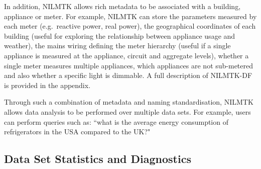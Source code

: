 \documentclass{sig-alternate}
\newcommand{\bluecolor}[1]{\textcolor{blue}{#1}}
\begin{document}
In addition, NILMTK allows rich metadata to be associated with a building, appliance or meter.  For example, NILMTK can store the parameters measured by each meter (e.g.\ reactive power, real power), the geographical coordinates of each building (useful for exploring the relationship between appliance usage and weather), the mains wiring defining the meter hierarchy (useful if a single appliance is measured at the appliance, circuit and aggregate levels), whether a single meter measures multiple appliances, which appliances are not sub-metered and also whether a specific light is dimmable. A full description of NILMTK-DF is provided in the appendix.


Through such a combination of metadata and naming standardisation, NILMTK allows data analysis to be performed over multiple data sets. For example, users can perform queries such as:
``what is the average energy consumption of refrigerators in the USA compared to the UK?"

\subsection{Data Set Statistics and Diagnostics}
\end{document}
